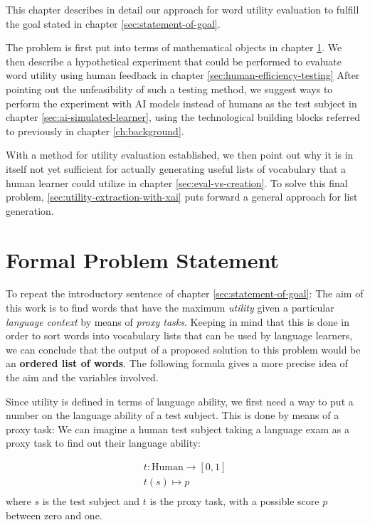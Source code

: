 This chapter describes in detail our approach for word utility evaluation to fulfill the goal stated in chapter \ref{sec:statement-of-goal}.

The problem is first put into terms of mathematical objects in chapter \ref{sec:formal-problem-statement}.
We then describe a hypothetical experiment that could be performed to evaluate word utility using human feedback in chapter \ref{sec:human-efficiency-testing}
After pointing out the unfeasibility of such a testing method, we suggest ways to perform the experiment with AI models instead of humans as the test subject in chapter \ref{sec:ai-simulated-learner}, using the technological building blocks referred to previously in chapter \ref{ch:background}.

With a method for utility evaluation established, we then point out why it is in itself not yet sufficient for actually generating useful lists of vocabulary that a human learner could utilize in chapter \ref{sec:eval-vs-creation}.
To solve this final problem, \ref{sec:utility-extraction-with-xai} puts forward a general approach for list generation.

\section{Formal Problem Statement} \label{sec:formal-problem-statement}


To repeat the introductory sentence of chapter \ref{sec:statement-of-goal}:
The aim of this work is to find words that have the maximum \textit{utility} given a particular \textit{language context} by means of \textit{proxy tasks}.
Keeping in mind that this is done in order to sort words into vocabulary lists that can be used by language learners, we can conclude that the output of a proposed solution to this problem would be an \textbf{ordered list of words}. The following formula gives a more precise idea of the aim and the variables involved.

Since utility is defined in terms of language ability, we first need a way to put a number on the language ability of a test subject. This is done by means of a proxy task: We can imagine a human test subject taking a language exam as a proxy task to find out their language ability:

\begin{align*}
	t: \text{Human} \to [0, 1] \\
	t (s) \mapsto p            \\
\end{align*}
where $s$ is the test subject and $t$ is the proxy task, with a possible score $p$ between zero and one.


